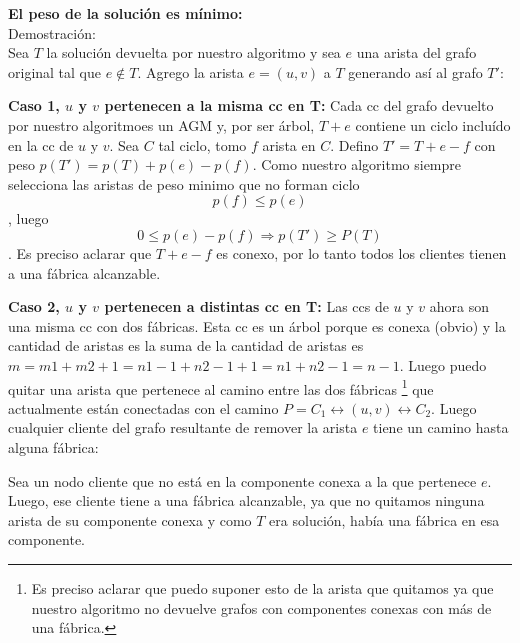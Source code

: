 
  \par{
  \textbf{El peso de la solución es mínimo:\\} 
  Demostración:\\
  Sea $T$ la solución devuelta por nuestro algoritmo y sea $e$ una arista del grafo original tal que $e \notin T$.
  Agrego la arista $e = (u,v)$ a $T$ generando así al grafo $T'$:

  \textbf{Caso 1, $u$ y $v$ pertenecen a la misma cc en T: } 
  Cada cc del grafo devuelto por nuestro algoritmoes un AGM y, por ser árbol,
  $T+e$ contiene un ciclo incluído en la cc de $u$ y $v$. Sea $C$ tal ciclo, tomo $f$
  arista en $C$. Defino $T' = T+e-f$ con peso $p(T') = p(T) + p(e) - p(f)$.
  Como nuestro algoritmo siempre selecciona las aristas de peso minimo que no forman ciclo
  $$p(f) \leq p(e)$$ , luego
  $$0 \leq p(e) - p(f) \Rightarrow p(T') \geq P(T)$$. Es preciso aclarar que $T+e-f$ es conexo, por lo tanto todos los clientes
  tienen a una fábrica alcanzable.

  \textbf{Caso 2, $u$ y $v$ pertenecen a distintas cc en T: }
  Las ccs de $u$ y $v$ ahora son una misma cc con dos fábricas. Esta cc es un árbol porque es conexa (obvio) y la cantidad de
  aristas es la suma de la cantidad de aristas es $m = m1+m2+1 = n1-1 + n2-1 +1 = n1+n2-1 = n-1$.
  Luego puedo quitar una arista que pertenece al camino entre las dos fábricas \footnote{Es preciso aclarar que puedo suponer esto de la arista
  que quitamos ya que nuestro algoritmo no devuelve grafos con componentes conexas con más de una fábrica.}
  que actualmente están conectadas con el  camino
  $ P = C_1 \leftrightarrow (u,v) \leftrightarrow C_2$. Luego cualquier cliente del grafo resultante de remover la arista $e$
  tiene un camino hasta alguna fábrica:
  
  Sea un nodo cliente que no está en la componente conexa a la que pertenece $e$. Luego, ese cliente tiene a una fábrica alcanzable,
  ya que no quitamos ninguna arista de su componente conexa y como $T$ era solución, había una fábrica en esa componente.
  
}
